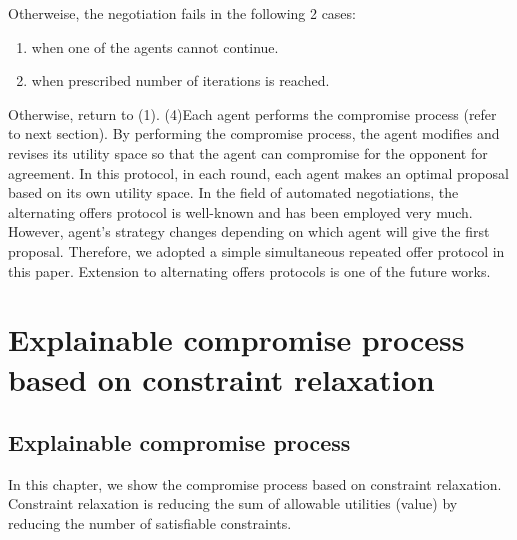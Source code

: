 \documentclass[paper]{ieice}
\begin{document}
Otherweise, the negotiation fails in the following 2 cases:


\begin{enumerate}
\renewcommand{\labelenumi}{\arabic{enumi}.}
\item when one of the agents cannot continue.
\item when prescribed number of iterations is reached.
\end{enumerate}

Otherwise, return to (1).
(4)Each agent performs the compromise process (refer to next section).
By performing the compromise process, the agent modifies and revises its utility space so that the agent can compromise for the opponent for agreement. In this protocol, in each round, each agent makes an optimal proposal based on its own utility space. In the field of automated negotiations, the alternating offers protocol \cite{Rubinstein1982} is well-known and has been employed very much. However, agent's strategy changes depending on which agent will give the first proposal. Therefore, we adopted a simple simultaneous repeated offer protocol in this paper. Extension to alternating offers protocols is one of the future works.


\section{Explainable compromise process based on constraint relaxation}
\subsection{Explainable compromise process}

In this chapter, we show the compromise process based on constraint relaxation. Constraint relaxation is reducing the sum of allowable utilities (value) by reducing the number of satisfiable constraints.
\end{document}
